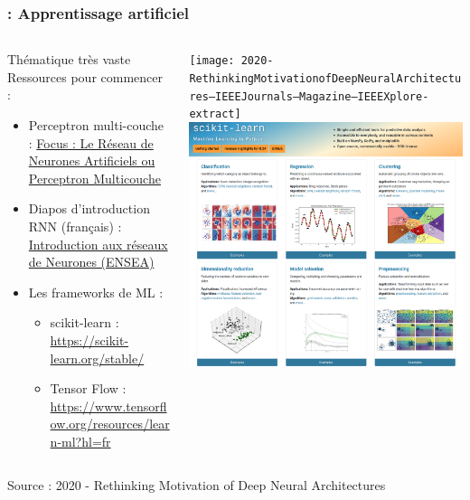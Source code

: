 \documentclass[aspectratio=169]{beamer}
\begin{document}
\begin{frame}
  \frametitle{\insertsection : Apprentissage artificiel}
  
  \begin{columns}
    \begin{column}{0.7\textwidth}
      Thématique très vaste\\
      \footnotesize
      Ressources pour commencer : 
      \begin{itemize}
        \item Perceptron multi-couche : 
        \href{https://penseeartificielle.fr/focus-reseau-neurones-artificiels-perceptron-multicouche/}
        {Focus : Le Réseau de Neurones Artificiels ou Perceptron Multicouche}
        \item Diapos d'introduction RNN (français) : 
        \href{https://perso-etis.ensea.fr/luvizon/pluxml/Neurones.pdf}
        {Introduction aux réseaux de Neurones (ENSEA)}
        \item Les frameworks de ML : 
        \begin{itemize}
          \footnotesize
          \item scikit-learn : \url{https://scikit-learn.org/stable/}
          \item Tensor Flow : \url{https://www.tensorflow.org/resources/learn-ml?hl=fr}
        \end{itemize}
      \end{itemize}
    \end{column}
    \begin{column}{0.35\textwidth}
      \texttt{[image: 2020-RethinkingMotivationofDeepNeuralArchitectures--IEEEJournals--Magazine--IEEEXplore-extract]}\\
      \includegraphics[width=\columnwidth]{scikit-learn}
    \end{column}
  \end{columns}

  {\tiny
  Source : 2020 - Rethinking Motivation of Deep Neural Architectures
  }
\end{frame}
\end{document}
